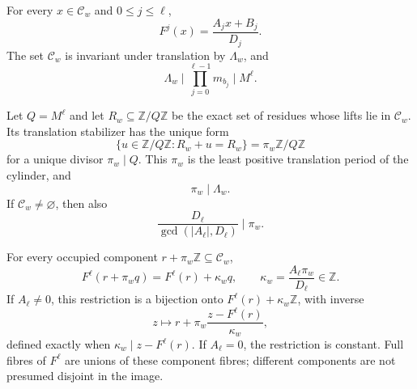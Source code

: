 \begin{theorem}
\label{thm:general-branch-cylinder}
For every $x\in\mathcal C_w$ and $0\le j\le\ell$,
\begin{equation}
 F^j(x)=\frac{A_jx+B_j}{D_j}.
 \label{eq:general-affine-word}
\end{equation}
The set $\mathcal C_w$ is invariant under translation by $\Lambda_w$, and
\begin{equation}
 \Lambda_w\mid\prod_{j=0}^{\ell-1}m_{b_j}\mid M^\ell.
 \label{eq:stability-divisibility}
\end{equation}

Let $Q=M^\ell$ and let $R_w\subseteq\mathbb Z/Q\mathbb Z$ be the exact set
of residues whose lifts lie in $\mathcal C_w$.  Its translation stabilizer
has the unique form
\[
 \{u\in\mathbb Z/Q\mathbb Z:R_w+u=R_w\}
   =\pi_w\mathbb Z/Q\mathbb Z
\]
for a unique divisor $\pi_w\mid Q$.  This $\pi_w$ is the least positive
translation period of the cylinder, and
\begin{equation}
 \pi_w\mid\Lambda_w.
 \label{eq:least-period-divides-stability}
\end{equation}
If $\mathcal C_w\ne\varnothing$, then also
\begin{equation}
 \frac{D_\ell}{\gcd(|A_\ell|,D_\ell)}\mid\pi_w.
 \label{eq:integrality-lower-period}
\end{equation}

For every occupied component $r+\pi_w\mathbb Z\subseteq\mathcal C_w$,
\begin{equation}
 F^\ell(r+\pi_wq)=F^\ell(r)+\kappa_wq,
 \qquad
 \kappa_w=\frac{A_\ell\pi_w}{D_\ell}\in\mathbb Z.
 \label{eq:least-cylinder-coordinate}
\end{equation}
If $A_\ell\ne0$, this restriction is a bijection onto
$F^\ell(r)+\kappa_w\mathbb Z$, with inverse
\begin{equation}
 z\longmapsto
 r+\pi_w\frac{z-F^\ell(r)}{\kappa_w},
 \label{eq:component-inverse}
\end{equation}
defined exactly when $\kappa_w\mid z-F^\ell(r)$.  If $A_\ell=0$, the
restriction is constant.  Full fibres of $F^\ell$ are unions of these
component fibres; different components are not presumed disjoint in the
image.
\end{theorem}

